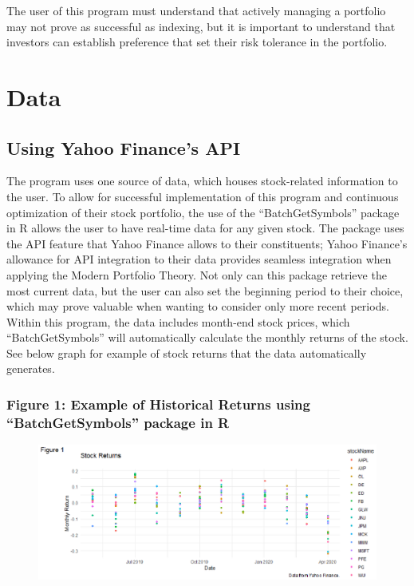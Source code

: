 \documentclass[12pt,english]{article}
\begin{document}
\begin{doublespace}
        \indent{}\indent{} 
        The user of this program must understand that actively managing a portfolio may not prove as successful as indexing, but it is important to understand that investors can establish preference that set their risk tolerance in the portfolio.


    \section{Data}\label{sec:data}\indent{}\indent{} %
    
        \subsection{Using Yahoo Finance's API}
        The program uses one source of data, which houses stock-related information to the user. To allow for successful implementation of this program and continuous optimization of their stock portfolio, the use of the “BatchGetSymbols” package in R allows the user to have real-time data for any given stock. The package uses the API feature that Yahoo Finance allows to their constituents; Yahoo Finance’s allowance for API integration to their data provides seamless integration when applying the Modern Portfolio Theory. Not only can this package retrieve the most current data, but the user can also set the beginning period to their choice, which may prove valuable when wanting to consider only more recent periods. Within this program, the data includes month-end stock prices, which “BatchGetSymbols” will automatically calculate the monthly returns of the stock. See below graph for example of stock returns that the data automatically generates.
        
            \subsubsection{Figure 1: Example of Historical Returns using “BatchGetSymbols” package in R}
                \begin{figure}
                    \begin{center}
                        \includegraphics{FinalProject_Carpenter.eps}
                    \end{center}
                \end{figure}
            

\end{doublespace}
\end{document}
